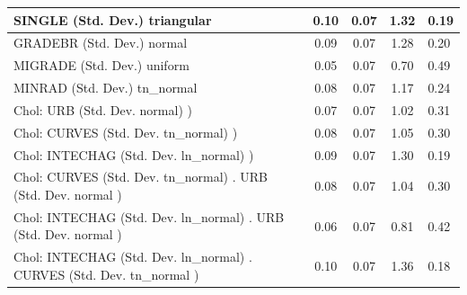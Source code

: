 \begin{table}
\begin{center}
\begin{tabular}{|l|l|c|c|c|l|}
			\hline
			SINGLE (Std. Dev.) triangular &  & 0.10 & 0.07 & 1.32 & 0.19 \\
			\hline
			GRADEBR (Std. Dev.) normal &  & 0.09 & 0.07 & 1.28 & 0.20 \\
			\hline
			MIGRADE (Std. Dev.) uniform &  & 0.05 & 0.07 & 0.70 & 0.49 \\
			\hline
			MINRAD (Std. Dev.) tn_normal &  & 0.08 & 0.07 & 1.17 & 0.24 \\
			\hline
			 Chol: URB (Std. Dev. normal) ) &  & 0.07 & 0.07 & 1.02 & 0.31 \\
			\hline
			 Chol: CURVES (Std. Dev. tn_normal) ) &  & 0.08 & 0.07 & 1.05 & 0.30 \\
			\hline
			 Chol: INTECHAG (Std. Dev. ln_normal) ) &  & 0.09 & 0.07 & 1.30 & 0.19 \\
			\hline
			 Chol: CURVES (Std. Dev. tn_normal) . URB (Std. Dev.   normal ) &  & 0.08 & 0.07 & 1.04 & 0.30 \\
			\hline
			 Chol: INTECHAG (Std. Dev. ln_normal) . URB (Std. Dev.   normal ) &  & 0.06 & 0.07 & 0.81 & 0.42 \\
			\hline
			 Chol: INTECHAG (Std. Dev. ln_normal) . CURVES (Std. Dev.   tn_normal ) &  & 0.10 & 0.07 & 1.36 & 0.18 \\
			\hline
		\end{tabular}
	\end{center}
\end{table}